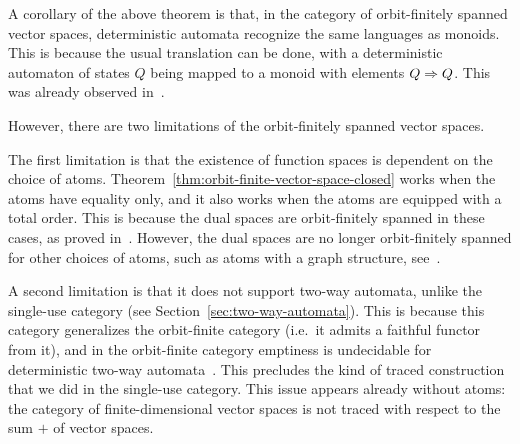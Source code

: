 A corollary of the above theorem is that, in the category of orbit-finitely spanned vector spaces, deterministic automata recognize the same languages as monoids. This is because the usual translation can be done, with a deterministic automaton of states $Q$ being mapped to a monoid with elements $Q \Rightarrow Q$. This was already observed in~\cite[Theorem VIII.3]{bojanczykKM21OrbitFiniteVector}.

However, there are two limitations of the orbit-finitely spanned vector spaces. 

The first limitation is that the existence of function spaces is dependent on the choice of atoms. Theorem~\ref{thm:orbit-finite-vector-space-closed}  works when the atoms have equality only, and it also works when the atoms are equipped with a total order. This is because the dual spaces are orbit-finitely spanned in these cases, as proved in~\cite[Corollary VI.5]{bojanczykKM21OrbitFiniteVector}. However, the dual spaces are no longer orbit-finitely spanned for other choices of  atoms, such as atoms with a graph structure, see~\cite[Example 9]{bojanczykKM21OrbitFiniteVector}.

A second limitation is that it does not support two-way automata, unlike the single-use category (see Section~\ref{sec:two-way-automata}). This is because this category generalizes the orbit-finite category (i.e.~it admits a faithful functor from it), and in the orbit-finite category emptiness is undecidable for deterministic two-way automata~\cite[Theorem 5.3]{nevenFiniteStateMachines2004}. This precludes the kind of traced construction that we did in the single-use category. This issue appears already without atoms: the category of finite-dimensional vector spaces is not traced with respect to the sum $+$ of vector spaces. 

